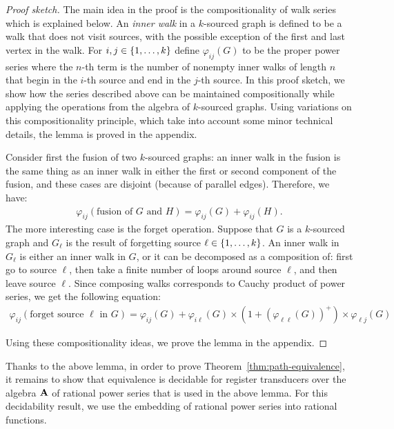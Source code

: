 \begin{proof}[Proof sketch] The main idea in the proof is the compositionality of walk series which is explained below. 
    An \emph{inner walk} in a $k$-sourced graph is defined to be a walk that does not visit sources, with the possible exception of the first and last vertex in the walk.  For $i,j \in \{1,\ldots,k\}$ define  $\varphi_{ij}(G)$ to be the proper power series where the $n$-th term is the number of nonempty inner walks of length $n$ that begin in the $i$-th source and end in the $j$-th source. In this proof sketch, we show how the series described above can be maintained compositionally
      while applying the operations from the algebra of $k$-sourced graphs. Using variations on this compositionality principle, which take into account some minor technical details, the lemma is proved in the appendix. 
    
      Consider first the fusion of two $k$-sourced graphs: an inner walk in the fusion is the same thing as an inner walk in either the first or second component of the fusion, and these cases are disjoint (because of parallel edges). Therefore, we have:
    \begin{align*}
    \varphi_{ij}(\text{fusion of $G$ and $H$}) =  \varphi_{ij}(G) + \varphi_{ij}(H).
    \end{align*}
    The more interesting case is the forget operation. Suppose that $G$ is a $k$-sourced graph and $G_\ell$ is the result of forgetting source $\ell \in \{1,\ldots,k\}$. An inner walk in $G_\ell$ is either an inner walk in $G$, or it can be decomposed as a composition of: first go to source $\ell$, then take a finite number of loops around source $\ell$, and then leave source $\ell$. Since composing walks corresponds to Cauchy product of power series, we get the  following equation:
    \begin{align*}
    \varphi_{ij}(\text{forget source $\ell$ in $G$}) = \varphi_{ij}(G) + \varphi_{i\ell}(G) \times (1 + (\varphi_{\ell \ell}(G))^+) \times \varphi_{\ell j}(G)
    \end{align*}
    
Using these compositionality ideas, we prove the lemma in the appendix.\end{proof}

Thanks to the above lemma, in order to prove Theorem~\ref{thm:path-equivalence}, it remains to show that equivalence is decidable for register transducers over the algebra $\mathbf{A}$ of rational power series that is used in the above lemma.  For this decidability result, we use the embedding of rational power series into rational functions. 

